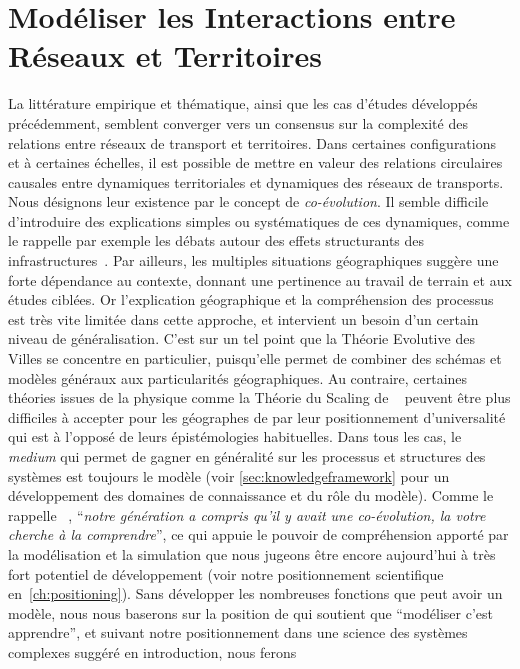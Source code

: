 

\chapter{Modéliser les Interactions entre Réseaux et Territoires}


\label{ch:modelinginteractions}





La littérature empirique et thématique, ainsi que les cas d'études développés précédemment, semblent converger vers un consensus sur la complexité des relations entre réseaux de transport et territoires. Dans certaines configurations et à certaines échelles, il est possible de mettre en valeur des relations circulaires causales entre dynamiques territoriales et dynamiques des réseaux de transports. Nous désignons leur existence par le concept de \emph{co-évolution}. Il semble difficile d'introduire des explications simples ou systématiques de ces dynamiques, comme le rappelle par exemple les débats autour des effets structurants des infrastructures~\cite{offner1993effets}. Par ailleurs, les multiples situations géographiques suggère une forte dépendance au contexte, donnant une pertinence au travail de terrain et aux études ciblées. Or l'explication géographique et la compréhension des processus est très vite limitée dans cette approche, et intervient un besoin d'un certain niveau de généralisation. C'est sur un tel point que la Théorie Evolutive des Villes se concentre en particulier, puisqu'elle permet de combiner des schémas et modèles généraux aux particularités géographiques. Au contraire, certaines théories issues de la physique comme la Théorie du Scaling de ~\cite{west2017scaling} peuvent être plus difficiles à accepter pour les géographes de par leur positionnement d'universalité qui est à l'opposé de leurs épistémologies habituelles. Dans tous les cas, le \emph{medium} qui permet de gagner en généralité sur les processus et structures des systèmes est toujours le modèle (voir \ref{sec:knowledgeframework} pour un développement des domaines de connaissance et du rôle du modèle). Comme le rappelle ~\cite{raimbault2017entretiens}, ``\textit{notre génération a compris qu'il y avait une co-évolution, la votre cherche à la comprendre}'', ce qui appuie le pouvoir de compréhension apporté par la modélisation et la simulation que nous jugeons être encore aujourd'hui à très fort potentiel de développement (voir notre positionnement scientifique en~\ref{ch:positioning}). Sans développer les nombreuses fonctions que peut avoir un modèle, nous nous baserons sur la position de  qui soutient que ``modéliser c'est apprendre'', et suivant notre positionnement dans une science des systèmes complexes suggéré en introduction, nous ferons 